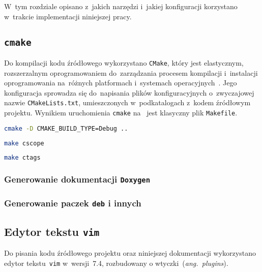 \documentclass[thesis]{subfiles}
\begin{document}
W~tym rozdziale opisano z~jakich narzędzi i~jakiej konfiguracji korzystano w~trakcie implementacji niniejszej pracy.

\subsection{\texttt{cmake}}

Do kompilacji kodu źródłowego wykorzystano \texttt{CMake}, który jest elastycznym, rozszerzalnym oprogramowaniem do~zarządzania procesem kompilacji i~instalacji oprogramowania na~różnych platformach i~systemach operacyjnych~\cite{cmake}. Jego konfiguracja sprowadza się do~napisania plików konfiguracyjnych o~zwyczajowej nazwie \mbox{\texttt{CMakeLists.txt}}, umieszczonych w~podkatalogach z~kodem źródłowym projektu. Wynikiem uruchomienia \texttt{cmake} na~ jest klasyczny plik \texttt{Makefile}.

\begin{lstlisting}[language=bash,numbers=none,caption={Uruchomienie \texttt{cmake} w~trybie \texttt{Debug}}]
cmake -D CMAKE_BUILD_TYPE=Debug ..
\end{lstlisting}

\begin{lstlisting}[language=bash,numbers=none,caption={Generowanie symboli dla \texttt{cscope}}]
make cscope
\end{lstlisting}

\begin{lstlisting}[language=bash,numbers=none,caption={Generowanie symboli dla \texttt{ctags}}]
make ctags
\end{lstlisting}

\subsubsection{Generowanie dokumentacji \texttt{Doxygen}}
\subsubsection{Generowanie paczek \texttt{deb} i innych}

\subsection{Edytor tekstu \texttt{vim}}

Do pisania kodu źródłowego projektu oraz niniejszej dokumentacji wykorzystano edytor tekstu~\texttt{vim} w~wersji~7.4, rozbudowany o wtyczki~(\emph{ang.~plugins}).
\end{document}

